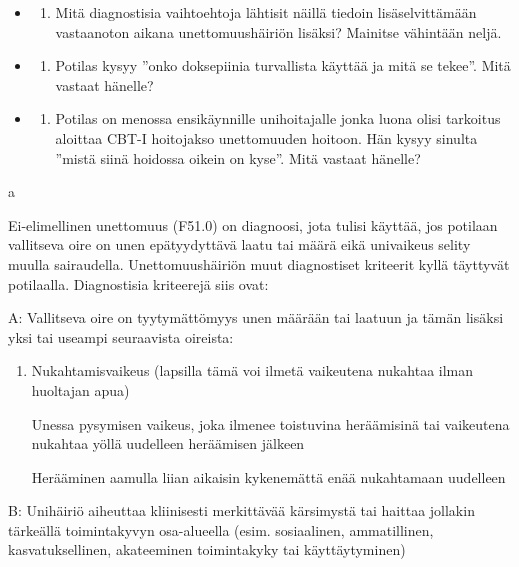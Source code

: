 \documentclass[
]{book}
\providecommand{\tightlist}{%
  \setlength{\itemsep}{0pt}\setlength{\parskip}{0pt}}
\begin{document}
\begin{itemize}
\tightlist
\item
  \begin{enumerate}
  \def\labelenumi{\alph{enumi})}
  \tightlist
  \item
    Mitä diagnostisia vaihtoehtoja lähtisit näillä tiedoin lisäselvittämään vastaanoton aikana unettomuushäiriön lisäksi? Mainitse vähintään neljä.
  \end{enumerate}
\item
  \begin{enumerate}
  \def\labelenumi{\alph{enumi})}
  \setcounter{enumi}{1}
  \tightlist
  \item
    Potilas kysyy ''onko doksepiinia turvallista käyttää ja mitä se tekee''. Mitä vastaat hänelle?
  \end{enumerate}
\item
  \begin{enumerate}
  \def\labelenumi{\alph{enumi})}
  \setcounter{enumi}{2}
  \tightlist
  \item
    Potilas on menossa ensikäynnille unihoitajalle jonka luona olisi tarkoitus aloittaa CBT-I hoitojakso unettomuuden hoitoon. Hän kysyy sinulta ''mistä siinä hoidossa oikein on kyse''. Mitä vastaat hänelle?
  \end{enumerate}
\end{itemize}

a

Ei-elimellinen unettomuus (F51.0) on diagnoosi, jota tulisi käyttää, jos potilaan vallitseva oire on unen epätyydyttävä laatu tai määrä eikä univaikeus selity muulla sairaudella. Unettomuushäiriön muut diagnostiset kriteerit kyllä täyttyvät potilaalla. Diagnostisia kriteerejä siis ovat:

A: Vallitseva oire on tyytymättömyys unen määrään tai laatuun ja tämän lisäksi yksi tai useampi seuraavista oireista:

\begin{enumerate}
\def\labelenumi{\arabic{enumi}.}
\tightlist
\item
  Nukahtamisvaikeus (lapsilla tämä voi ilmetä vaikeutena nukahtaa ilman huoltajan apua)

  Unessa pysymisen vaikeus, joka ilmenee toistuvina heräämisinä tai vaikeutena nukahtaa yöllä uudelleen heräämisen jälkeen

  Herääminen aamulla liian aikaisin kykenemättä enää nukahtamaan uudelleen
\end{enumerate}

B: Unihäiriö aiheuttaa kliinisesti merkittävää kärsimystä tai haittaa jollakin tärkeällä toimintakyvyn osa-alueella (esim. sosiaalinen, ammatillinen, kasvatuksellinen, akateeminen toimintakyky tai käyttäytyminen)
\end{document}
